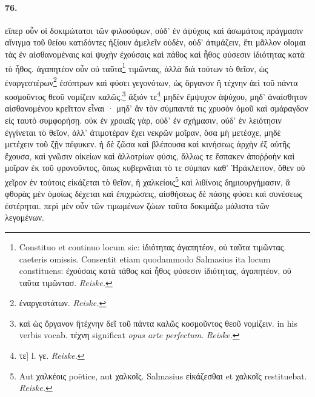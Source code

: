 \documentclass[a4paper, 11pt, oneside, polutonikogreek, german]{article}
\begin{document}
\paragraph{76.}
εἴπερ οὖν οἱ δοκιμώτατοι τῶν φιλοσόφων, οὐδ' ἐν ἀψύχοις καὶ ἀσωμάτοις πράγμασιν αἴνιγμα τοῦ θείου κατιδόντες ἠξίουν ἀμελεῖν οὐδὲν, οὐδ' ἀτιμάζειν, ἔτι μᾶλλον οἴομαι τὰς ἐν αἰσθανομέναις καὶ ψυχὴν ἐχούσαις καὶ πάθος καὶ ἦθος φύσεσιν ἰδιότητας κατὰ τὸ ἦθος. ἀγαπητέον οὖν οὐ ταῦτα\footnote{Constituo et continuo locum sic: ἰδιότητας ἀγαπητέον, οὐ ταῦτα τιμῶντας. caeteris omissis. Consentit etiam quodammodo Salmasius ita locum constituens: ἐχούσαις κατὰ τάθος καὶ ἦθος φύσεσιν ἰδιότητας, ἀγαπητέον, οὐ ταῦτα τιμῶντασ. \emph{Reiske.}} τιμῶντας, ἀλλὰ διὰ τούτων τὸ θεῖον, ὡς ἐναργεστέρων\footnote{ἐναργεστάτων. \emph{Reiske.}} ἐσόπτρων καὶ φύσει γεγονότων, ὡς ὄργανον ἢ τέχνην ἀεὶ τοῦ πάντα κοσμοῦντος θεοῦ νομίζειν καλῶς.\footnote{καὶ ὡς ὂργανον ἢτέχνην δεῖ τοῦ πάντα καλῶς κοσμοῦντος θεοῦ νομίζειν. in his verbis vocab. τέχνη significat \emph{opus arte perfectum}. \emph{Reiske.}} ἄξιόν τε\footnote{τε] l. γε. \emph{Reiske.}} μηδὲν ἔμψυχον ἀψύχου, μηδ' ἀναίσθητον αἰσθανομένου κρεῖττον εἶναι · μηδ' ἂν τὸν σύμπαντά τις χρυσὸν ὁμοῦ καὶ σμάραγδον εἰς ταυτὸ συμφορήσῃ. οὐκ ἐν χροιαῖς γὰρ, οὐδ' ἐν σχήμασιν, οὐδ' ἐν λειότησιν ἐγγίνεται τὸ θεῖον, ἀλλ' ἀτιμοτέραν ἔχει νεκρῶν μοῖραν, ὅσα μὴ μετέσχε, μηδὲ μετέχειν τοῦ ζῇν πέφυκεν. ἡ δὲ ζῶσα καὶ βλέπουσα καὶ κινήσεως ἀρχὴν ἐξ αὑτῆς ἔχουσα, καὶ γνῶσιν οἰκείων καὶ ἀλλοτρίων φύσις, ἄλλως τε ἔσπακεν ἀποῤῥοὴν καὶ μοῖραν ἐκ τοῦ φρονοῦντος, ὅπως κυβερνᾶται τὸ τε σύμπαν καθ' Ἡράκλειτον, ὅθεν οὐ χεῖρον ἐν τούτοις εἰκάζεται τὸ θεῖον, ἢ χαλκείοις\footnote{Aut χαλκέοις poëtice, aut χαλκοῖς. Salmasius εἰκάζεσθαι et χαλκοῖς restituebat. \emph{Reiske.}} καὶ λιθίνοις δημιουργήμασιν, ἃ φθορὰς μὲν ὁμοίως δέχεται καὶ ἐπιχρώσεις, αἰσθήσεως δὲ πάσης φύσει καὶ συνέσεως ἐστέρηται. περὶ μὲν οὖν τῶν τιμωμένων ζώων ταῦτα δοκιμάζω μάλιστα τῶν λεγομένων.
\end{document}
